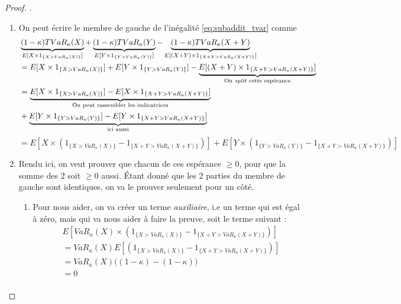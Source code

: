 \begin{proof}
.
\begin{enumerate}[label=(\arabic*)]
\item On peut écrire le membre de gauche de l'inégalité \eqref{eq:subaddit_tvar} comme
\begin{align*}
& \underbrace{(1 - \kappa)TVaR_\kappa(X)}_{E[ X \times 1_{\{X > VaR_\kappa(X) \}} ]} + \underbrace{(1 - \kappa)TVaR_\kappa(Y)}_{E[ Y \times 1_{\{Y > VaR_\kappa(Y) \}} ]} - \underbrace{(1 - \kappa)TVaR_\kappa(X + Y)}_{E[ (X+Y) \times 1_{\{X+Y > VaR_\kappa(X+Y) \}} ]} \\
& = E[X \times 1_{\{X > VaR_\kappa(X) \}}] + E[Y \times 1_{\{Y > VaR_\kappa(Y) \}}] - \underbrace{E[ (X+Y) \times 1_{\{X + Y > VaR_\kappa(X + Y) \}} ]}_{\text{On \textit{split} cette espérance}} \\
& = \underbrace{E[X \times 1_{\{X > VaR_\kappa(X) \}}] - E[X \times 1_{\{X+Y > VaR_\kappa(X+Y) \}}]}_{\text{On peut rassembler les indicatrices}} \\
& + \underbrace{E[Y \times 1_{\{Y > VaR_\kappa(Y) \}}] - E[Y \times 1_{\{X+Y > VaR_\kappa(X+Y) \}}]}_{\text{ici aussi}} \\
\end{align*}
\begin{equation}
\label{eq:espTronq_VaR}
= E[X \times (1_{\{X > VaR_\kappa(X) \}} - 1_{\{X+Y > VaR_\kappa(X+Y) \}})] + E[Y \times (1_{\{Y > VaR_\kappa(Y) \}} - 1_{\{X+Y > VaR_\kappa(X+Y) \}})]
\end{equation}
\item Rendu ici, on veut prouver que chacun de ces espérance $\ge 0$, pour que la somme des 2 soit $\ge 0$ aussi. Étant donné que les 2 parties du membre de gauche sont identiques, on va le prouver seulement pour un côté.
\p
\begin{enumerate}[label=(2.\arabic*)]
	\item Pour nous aider, on va créer un terme \textit{auxiliaire}, i.e un terme qui est égal à zéro, mais qui va nous aider à faire la preuve, soit le terme suivant : 
\begin{align*}
& E[VaR_\kappa(X) \times (1_{\{X > VaR_\kappa(X) \}} - 1_{\{X+Y > VaR_\kappa(X+Y) \}})] \\
& = VaR_\kappa(X) E[(1_{\{X > VaR_\kappa(X) \}} - 1_{\{X+Y > VaR_\kappa(X+Y) \}})] \\
& = VaR_\kappa(X) \big( (1-\kappa) - (1-\kappa)  \big) \\
& = 0 \\
\end{align*} 

\end{enumerate}
\end{enumerate}
\end{proof}
